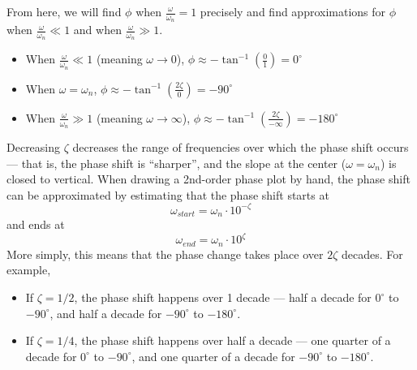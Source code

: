 \documentclass{book}
\begin{document}
From here, we will find $ \phi $ when $ \frac{\omega}{\omega_n} = 1 $ precisely and find approximations for $ \phi $ when $ \frac{\omega}{\omega_n} \ll 1 $ and when $ \frac{\omega}{\omega_n} \gg 1 $. 
\begin{itemize}
	\item When $ \frac{\omega}{\omega_n} \ll 1 $ (meaning $ \omega\to 0 $), $ \phi\approx -\tan^{-1}(\frac{0}{1})=0^\circ$
	\item When $ \omega = \omega_n $, $ \phi\approx -\tan^{-1}(\frac{2\zeta}{0})=-90^\circ $
	\item When $ \frac{\omega}{\omega_n} \gg 1 $ (meaning $ \omega\to \infty $), $ \phi\approx -\tan^{-1}(\frac{2\zeta}{-\infty})=-180^\circ $
\end{itemize}
Decreasing $ \zeta $ decreases the range of frequencies over which the phase shift occurs --- that is, the phase shift is ``sharper'', and the slope at the center ($ \omega=\omega_n $) is closed to vertical. When drawing a 2nd-order phase plot by hand, the phase shift can be approximated by estimating that the phase shift starts at
\[ \omega_{start} = \omega_n \cdot 10^{-\zeta} \] 
and ends at
\[ \omega_{end} = \omega_n \cdot 10^{\zeta} \]
More simply, this means that the phase change takes place over $ 2\zeta $ decades. For example,
\begin{itemize}
	\item If $ \zeta = 1/2 $, the phase shift happens over 1 decade --- half a decade for $ 0^\circ $ to $ -90^\circ $, and half a decade for $ -90^\circ $ to $ -180^\circ $.
	\item If $ \zeta = 1/4 $, the phase shift happens over half a decade --- one quarter of a decade for $ 0^\circ $ to $ -90^\circ $, and one quarter of a decade for $ -90^\circ $ to $ -180^\circ $.
\end{itemize}
\end{document}
